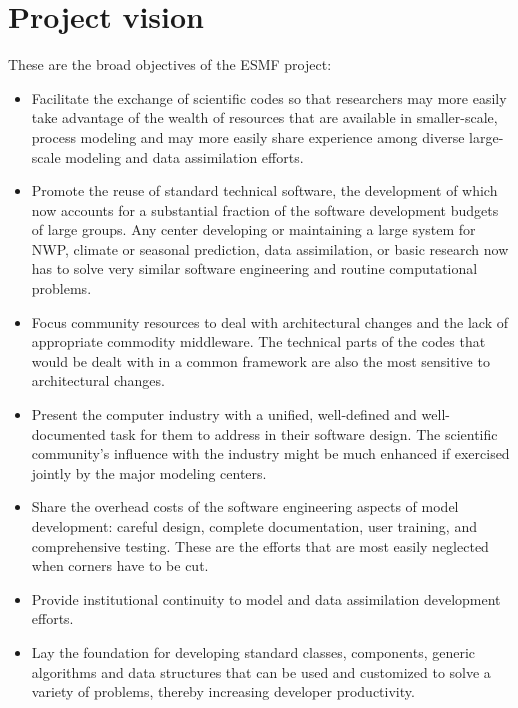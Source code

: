 \section{Project vision}
\label{sec:project_vision}

These are the broad objectives of the ESMF project:

\begin{itemize}
  
\item Facilitate the exchange of scientific codes so that researchers
  may more easily take advantage of the wealth of resources that are
  available in smaller-scale, process modeling and may more easily
  share experience among diverse large-scale modeling and data
  assimilation efforts.
  
\item Promote the reuse of standard technical software, the
  development of which now accounts for a substantial fraction of the
  software development budgets of large groups.  Any center developing
  or maintaining a large system for NWP, climate or seasonal
  prediction, data assimilation, or basic research now has to solve
  very similar software engineering and routine computational
  problems.
  
\item Focus community resources to deal with architectural changes and
  the lack of appropriate commodity middleware. The technical parts of
  the codes that would be dealt with in a common framework are also
  the most sensitive to architectural changes.
  
\item Present the computer industry with a unified, well-defined and
  well-documented task for them to address in their software design.
  The scientific community's influence with the industry might be much
  enhanced if exercised jointly by the major modeling centers.
  
\item Share the overhead costs of the software engineering aspects of
  model development: careful design, complete documentation, user
  training, and comprehensive testing. These are the efforts that are
  most easily neglected when corners have to be cut.
  
\item Provide institutional continuity to model and data assimilation
  development efforts.

\item Lay the foundation for developing standard classes, components, 
generic algorithms and data structures that can be used and customized
to solve a variety of problems, thereby increasing developer productivity.

\end{itemize}

